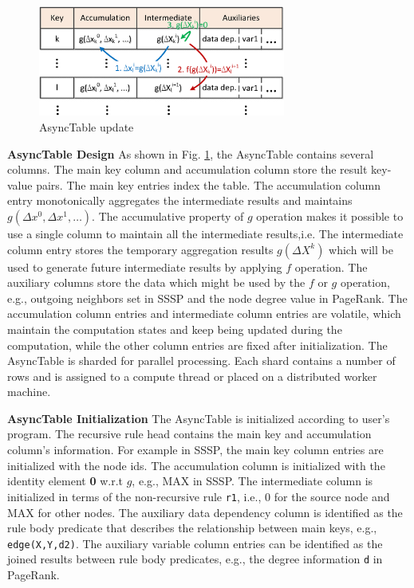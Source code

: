 \begin{figure}[!t]
    \centering
  \includegraphics[width=3.2in]{fig/asynctable}
  \vspace{-0.1in}
  \caption{AsyncTable update}
  \label{fig:asynctable}
  \vspace{-0.2in}
\end{figure}


\noindent\textbf{AsyncTable Design}
As shown in Fig. \ref{fig:asynctable}, the AsyncTable contains several columns. The main key column and accumulation column store the result key-value pairs. The main key entries index the table. The accumulation column entry monotonically aggregates the intermediate results and maintains $g(\Delta x^0,\Delta x^1,\ldots)$. The accumulative property of $g$ operation makes it possible to use a single column to maintain all the intermediate results,i.e. The intermediate column entry stores the temporary aggregation results $g(\Delta X^k)$ which will be used to generate future intermediate results by applying $f$ operation. The auxiliary columns store the data which might be used by the $f$ or $g$ operation, e.g., outgoing neighbors set in SSSP and the node degree value in PageRank. The accumulation column entries and intermediate column entries are volatile, which maintain the computation states and keep being updated during the computation, while the other column entries are fixed after initialization. The AsyncTable is sharded for parallel processing. Each shard contains a number of rows and is assigned to a compute thread or placed on a distributed worker machine.

\noindent\textbf{AsyncTable Initialization}
The AsyncTable is initialized according to user's program. The recursive rule head contains the main key and accumulation column's information. For example in SSSP, the main key column entries are initialized with the node ids. The accumulation column is initialized with the identity element \textbf{0} w.r.t $g$, e.g., MAX in SSSP. The intermediate column is initialized in terms of the non-recursive rule \texttt{r1}, i.e., 0 for the source node and MAX for other nodes. The auxiliary data dependency column is identified as the rule body predicate that describes the relationship between main keys, e.g., \texttt{edge(X,Y,d2)}. The auxiliary variable column entries can be identified as the joined results between rule body predicates, e.g., the degree information \texttt{d} in PageRank.

